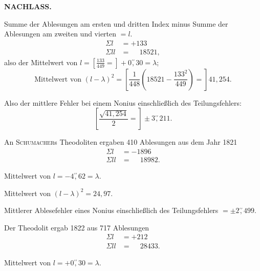 \par\clearpage
\noindent{}\hfill{\small\textbf{NACHLASS.}}\hfill\null\par\medskip
\par\noindent\hspace*{\parindent}Summe der Ablesungen am ersten und dritten Index minus Summe der Ablesungen am zweiten und vierten $=l$.
\[
\begin{aligned}
\Sigma l&=+133\\
\Sigma ll&=\phantom{+}18521,
\end{aligned}
\]
\noindent also der Mittelwert von $l=\left[\frac{133}{449}=\right]+0\overset{\prime\prime}{,}30=\lambda$;
\[
\text{Mittelwert von }(l-\lambda)^2=
\left[\frac{1}{448}\left(18521-\frac{133^2}{449}\right)=\right]41{,}254.
\]
\par\noindent\hspace*{\parindent}Also der mittlere Fehler bei einem Nonius einschließlich des Teilungsfehlers:
\[
\left[\frac{\sqrt{41{,}254}}{2}=\right]\pm3\overset{\prime\prime}{,}211.
\]
\par\noindent\hspace*{\parindent}An \textsc{Schumacher}s Theodoliten ergaben 410 Ablesungen aus dem Jahr 1821
\[
\begin{aligned}
\Sigma l&=-1896\\
\Sigma ll&=\phantom{-}18982.
\end{aligned}
\]
\par\noindent\hspace*{\parindent}Mittelwert von $l=-4\overset{\prime\prime}{,}62=\lambda$.
\par\noindent\hspace*{\parindent}Mittelwert von $(l-\lambda)^2=24{,}97$.
\par\noindent\hspace*{\parindent}Mittlerer Ablesefehler eines Nonius einschließlich des Teilungsfehlers $=\pm2\overset{\prime\prime}{,}499$.
\par\bigskip\bigskip
\par\noindent\hspace*{\parindent}Der Theodolit ergab 1822 aus 717 Ablesungen
\[
\begin{aligned}
\Sigma l&=+212\\
\Sigma ll&=\phantom{+}28433.
\end{aligned}
\]
\par\noindent\hspace*{\parindent}Mittelwert von $l=+0\overset{\prime\prime}{,}30=\lambda$.
